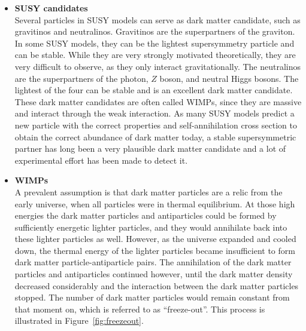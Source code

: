 \begin{itemize}
 \item[] \textbf{\acs{SUSY} candidates}\\
         Several particles in \ac{SUSY} models can serve as dark matter candidate, such as gravitinos and neutralinos. Gravitinos are the superpartners of the graviton. In some \ac{SUSY} models, they can be the lightest supersymmetry particle and can be stable. While they are very strongly motivated theoretically, they are very difficult to observe, as they only interact gravitationally. The neutralinos are the superpartners of the photon, $Z$ boson, and neutral Higgs bosons. The lightest of the four can be stable and is an excellent dark matter candidate. These dark matter candidates are often called \acp{WIMP}, since they are massive and interact through the weak interaction. As many \ac{SUSY} models predict a new particle with the correct properties and self-annihilation cross section to obtain the correct abundance of dark matter today, a stable supersymmetric partner has long been a very plausible dark matter candidate and a lot of experimental effort has been made to detect it.
         
 \item[] \textbf{\acp{WIMP}}\\         
         A prevalent assumption is that dark matter particles are a relic from the early universe, when all particles were in thermal equilibrium. At those high energies the dark matter particles and antiparticles could be formed by sufficiently energetic lighter particles, and they would annihilate back into these lighter particles as well. However, as the universe expanded and cooled down, the thermal energy of the lighter particles became insufficient to form dark matter particle-antiparticle pairs. The annihilation of the dark matter particles and antiparticles continued however, until the dark matter density decreased considerably and the interaction between the dark matter particles stopped. The number of dark matter particles would remain constant from that moment on, which is referred to as ``freeze-out''. This process is illustrated in Figure~\ref{fig:freezeout}.


\end{itemize}
